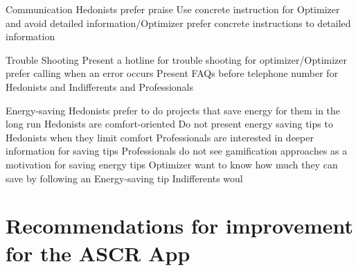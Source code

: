 Communication
Hedonists prefer praise 
Use concrete instruction for Optimizer and avoid detailed information/Optimizer prefer concrete instructions to detailed information

Trouble Shooting
Present a hotline for trouble shooting for optimizer/Optimizer prefer calling when an error occurs
Present FAQs before telephone number for Hedonists and Indifferents and Professionals

Energy-saving
Hedonists prefer to do projects that save energy for them in the long run
Hedonists are comfort-oriented Do not present energy saving tips to Hedonists when they limit comfort
Professionals are interested in deeper information for saving tips
Professionals do not see gamification approaches as a motivation for saving energy tips
Optimizer want to know how much they can save by following an Energy-saving tip
Indifferents woul


















\section{Recommendations for improvement for the ASCR App}

